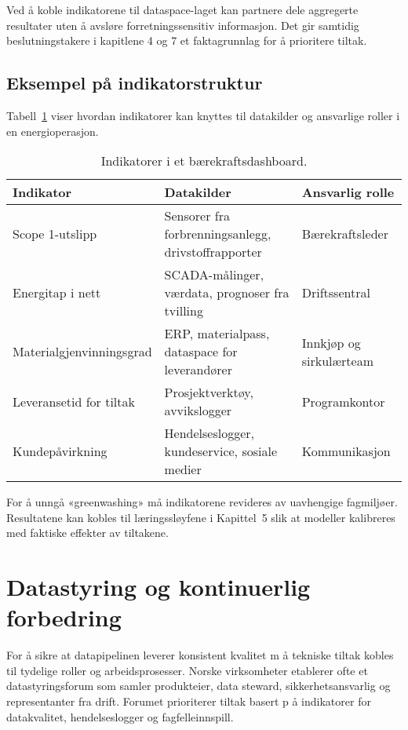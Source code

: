 Ved å koble indikatorene til dataspace-laget kan partnere dele aggregerte resultater uten å avsløre forretningssensitiv informasjon.
Det gir samtidig beslutningstakere i kapitlene 4 og 7 et faktagrunnlag for å prioritere tiltak.

\subsection{Eksempel på indikatorstruktur}
Tabell~\ref{tab:kap03-dashboard} viser hvordan indikatorer kan knyttes til datakilder og ansvarlige roller i en energioperasjon.

\begin{table}[ht]
    \centering
    \caption{Indikatorer i et bærekraftsdashboard.}
    \label{tab:kap03-dashboard}
    \begin{tabular}{p{}p{}p{}}
        \toprule
        \textbf{Indikator} & \textbf{Datakilder} & \textbf{Ansvarlig rolle} \\
        \midrule
        Scope 1-utslipp & Sensorer fra forbrenningsanlegg, drivstoffrapporter & Bærekraftsleder \\
        Energitap i nett & SCADA-målinger, værdata, prognoser fra tvilling & Driftssentral \\
        Materialgjenvinningsgrad & ERP, materialpass, dataspace for leverandører & Innkjøp og sirkulærteam \\
        Leveransetid for tiltak & Prosjektverktøy, avvikslogger & Programkontor \\
        Kundepåvirkning & Hendelseslogger, kundeservice, sosiale medier & Kommunikasjon \\
        \bottomrule
    \end{tabular}
\end{table}

For å unngå «greenwashing» må indikatorene revideres av uavhengige fagmiljøer. Resultatene kan kobles til læringssløyfene i
Kapittel~5 slik at modeller kalibreres med faktiske effekter av tiltakene.

\section{Datastyring og kontinuerlig forbedring}
For  å sikre at datapipelinen leverer konsistent kvalitet m å tekniske tiltak kobles til tydelige roller og arbeidsprosesser. Norske virksomheter etablerer ofte et datastyringsforum som samler produkteier, data steward, sikkerhetsansvarlig og representanter fra drift. Forumet prioriterer tiltak basert p å indikatorer for datakvalitet, hendelseslogger og fagfelleinnspill.

